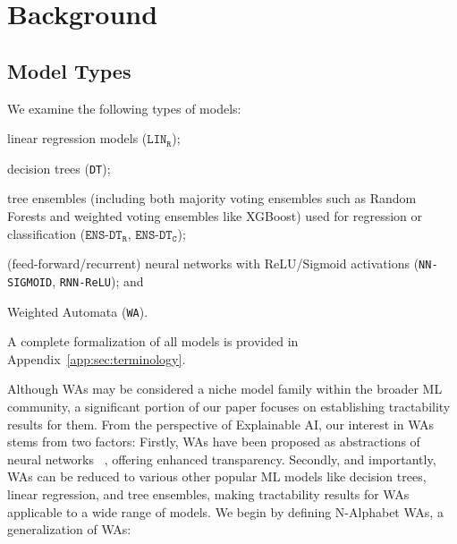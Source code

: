 \section{Background} \label{sec:background}


\subsection{Model Types}

We examine the following types of models: \begin{inparaenum}[(i)] \item linear regression models ($\texttt{LIN}_{\texttt{R}}$); \item decision trees (\texttt{DT}); \item tree ensembles (including both majority voting ensembles such as Random Forests and weighted voting ensembles like XGBoost) used for regression or classification ($\texttt{ENS-DT}_{\texttt{R}}$, $\texttt{ENS-DT}_{\texttt{C}}$); \item (feed-forward/recurrent) neural networks with ReLU/Sigmoid activations (\texttt{NN-SIGMOID}, \texttt{RNN-ReLU}); and \item Weighted Automata (\texttt{WA}). \end{inparaenum} A complete formalization of all models is provided in Appendix~\ref{app:sec:terminology}.

Although WAs may be considered a niche model family within the broader ML community, a significant portion of our paper focuses on establishing tractability results for them. From the perspective of Explainable AI, our interest in WAs stems from two factors:  Firstly, WAs have been proposed as abstractions of neural networks ~\citep{okudono2020weighted, eyraud2024distillation, weiss2019learning, lacroce2021extracting}, offering enhanced transparency. Secondly, and importantly, WAs can be reduced to various other popular ML models like decision trees, linear regression, and tree ensembles, making tractability results for WAs applicable to a wide range of models. We begin by defining N-Alphabet WAs, a generalization of WAs: %








